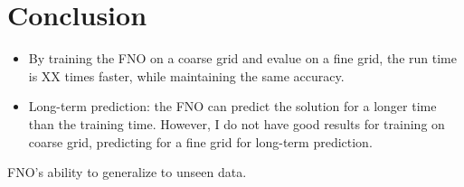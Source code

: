 \chapter{Conclusion}\label{ch:conclusion}


\begin{itemize}
    \item By training the FNO on a coarse grid and evalue on a fine grid, the run time is XX times faster, while maintaining the same accuracy.
    \item Long-term prediction: the FNO can predict the solution for a longer time than the training time. However, I do not have good results for training on coarse grid, predicting for a fine grid for long-term prediction.
\end{itemize}



FNO's ability to generalize to unseen data.